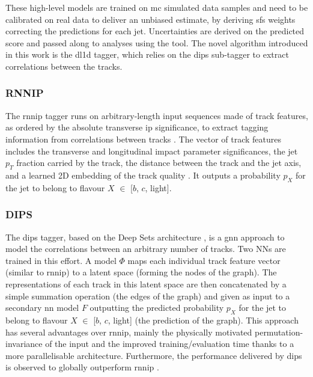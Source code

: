 These high-level models are trained on \gls{mc} simulated data samples and need to be calibrated on real data to deliver an unbiased estimate, by deriving \glspl{sf} weights correcting the predictions for each jet. Uncertainties are derived on the predicted score and passed along to analyses using the tool. The novel algorithm introduced in this work is the \gls{dl1d} tagger, which relies on the \gls{dips} sub-tagger to extract correlations between the tracks.  

\subsubsection{RNNIP}
The \gls{rnnip} tagger runs on arbitrary-length input sequences made of track features, as ordered by the absolute transverse \gls{ip} significance, to extract tagging information from correlations between tracks \cite{ATL-PHYS-PUB-2017-003}. The vector of track features includes the transverse and longitudinal impact parameter significances, the jet $p_T$ fraction carried by the track, the distance between the track and the jet axis, and a learned 2D embedding of the track quality \cite{Paganini:2289214}. It outputs a probability $p_X$ for the jet to belong to flavour $X$ $\in$ [$b$, $c$, light].

\subsubsection{DIPS}
The \gls{dips} tagger, based on the Deep Sets architecture \cite{NIPS2017_f22e4747}, is a \gls{gnn} approach to model the correlations between an arbitrary number of tracks. Two NNs are trained in this effort. A model $\Phi$ maps each individual track feature vector (similar to \gls{rnnip}) to a latent space (forming the nodes of the graph). The representations of each track in this latent space are then concatenated by a simple summation operation (the edges of the graph) and given as input to a secondary \gls{nn} model $F$ outputting the predicted probability $p_X$ for the jet to belong to flavour $X$ $\in$ [$b$, $c$, light] (the prediction of the graph). This approach has several advantages over \gls{rnnip}, mainly the physically motivated permutation-invariance of the input and the improved training/evaluation time thanks to a more parallelisable architecture. Furthermore, the performance delivered by \gls{dips} is observed to globally outperform \gls{rnnip} \cite{ATL-PHYS-PUB-2020-014}. 

